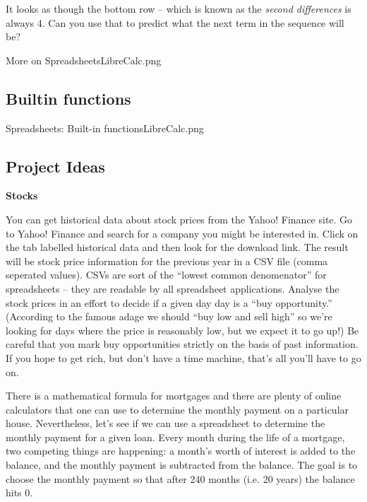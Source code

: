 It looks as though the bottom row -- which is known as the {\em second differences} is always 4.  Can you use that to predict what the next term in the sequence will be?

\clearpage
\begin{worksheet}{12}{More on Spreadsheets}{LibreCalc.png}

\end{worksheet}
\clearpage



\subsection{Builtin functions}


\clearpage
\begin{worksheet}{13}{Spreadsheets: Built-in functions}{LibreCalc.png}

\end{worksheet}
\clearpage

\subsection{Project Ideas}

{\bf Stocks}

You can get historical data about stock prices from the Yahoo! Finance site.  Go to Yahoo! Finance and search for a company you might be interested in.  Click on the tab labelled historical data and then look for the download link.  The result will be stock price information for the previous year in a CSV file (comma seperated values).  CSVs are sort of the ``lowest common denomenator'' for spreadsheets -- they are readable by all spreadsheet applications.  Analyse the stock prices in an effort to decide if a given day day is a ``buy opportunity.''  (According to the famous adage we should ``buy low and sell high'' so we're looking for days where the price is reasonably low, but we expect it to go up!)  Be careful that you mark buy opportunities strictly on the basis of past information.  If you hope to get rich, but don't have a time machine, that's all you'll have to go on.


There is a mathematical formula for mortgages and there are plenty of online calculators that one can use to determine the monthly payment on a particular house.  Nevertheless, let's see if we can use a spreadsheet to determine the monthly payment for a given loan.  Every month during the life of a mortgage, two competing things are happening:  a month's worth of interest is added to the balance, and the monthly payment is subtracted from the balance. The goal is to choose the monthly payment so that after 240 months (i.e. 20 years) the balance hits 0.

